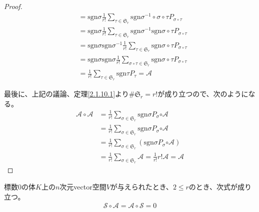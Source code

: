 \documentclass[dvipdfmx]{jsarticle}
\begin{document}
\begin{proof}
\begin{align*}
&= \mathrm{sgn}\sigma\frac{1}{r!}\sum_{\tau \in \mathfrak{S}_{r}} {\mathrm{sgn}{\sigma^{- 1} \circ \sigma \circ \tau}P_{\sigma \circ \tau}}\\
&= \mathrm{sgn}\sigma\frac{1}{r!}\sum_{\tau \in \mathfrak{S}_{r}} {\mathrm{sgn}\sigma^{- 1}\mathrm{sgn}{\sigma \circ \tau}P_{\sigma \circ \tau}}\\
&= \mathrm{sgn}\sigma\mathrm{sgn}\sigma^{- 1}\frac{1}{r!}\sum_{\tau \in \mathfrak{S}_{r}} {\mathrm{sgn}{\sigma \circ \tau}P_{\sigma \circ \tau}}\\
&= \mathrm{sgn}\sigma\mathrm{sgn}\sigma\frac{1}{r!}\sum_{\sigma \circ \tau \in \mathfrak{S}_{r}} {\mathrm{sgn}{\sigma \circ \tau}P_{\sigma \circ \tau}}\\
&= \frac{1}{r!}\sum_{\tau \in \mathfrak{S}_{r}} {\mathrm{sgn}\tau P_{\tau}}=\mathcal{A}
\end{align*}\par
最後に、上記の議論、定理\ref{2.1.10.1}より${\#}\mathfrak{S}_{r} = r!$が成り立つので、次のようになる。
\begin{align*}
\mathcal{A \circ A} &= \frac{1}{r!}\sum_{\sigma \in \mathfrak{S}_{r}} {\mathrm{sgn}\sigma P_{\sigma}}\mathcal{\circ A}\\
&= \frac{1}{r!}\sum_{\sigma \in \mathfrak{S}_{r}} {\mathrm{sgn}\sigma P_{\sigma}\mathcal{\circ A}}\\
&= \frac{1}{r!}\sum_{\sigma \in \mathfrak{S}_{r}} \left( \mathrm{sgn}\sigma P_{\sigma}\mathcal{\circ A} \right)\\
&= \frac{1}{r!}\sum_{\sigma \in \mathfrak{S}_{r}} \mathcal{A} = \frac{1}{r!}r!\mathcal{A = A}
\end{align*}
\end{proof}
\begin{thm}\label{2.4.8.11}
標数$0$の体$K$上の$n$次元vector空間$V$が与えられたとき、$2 \leq r$のとき、次式が成り立つ。
\begin{align*}
\mathcal{S} \circ \mathcal{A} = \mathcal{A \circ S} = 0
\end{align*}
\end{thm}
\end{document}
